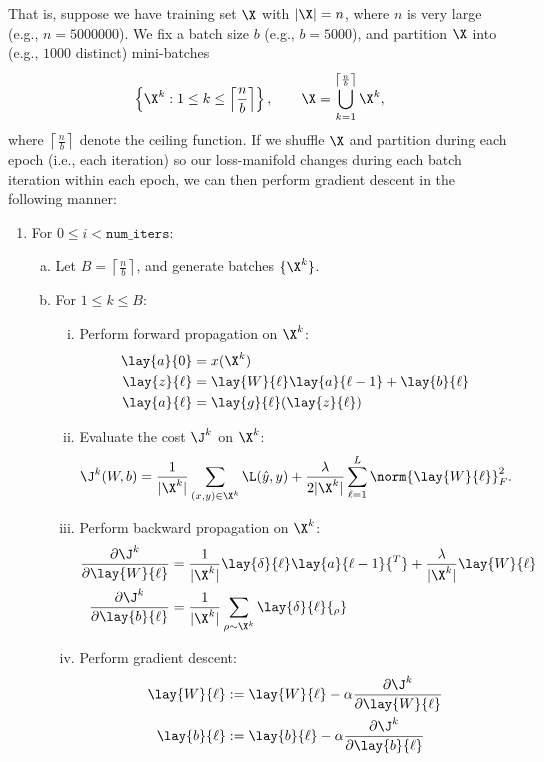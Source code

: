That is, suppose we have training set $\X$ with $|\X|=n$, where $n$ is very large (e.g., $n=5000000$).  We fix a batch size $b$ (e.g., $b=5000$), and partition $\X$ into (e.g., $1000$ distinct) mini-batches
$$\left\{\X^k:1\leq k\leq \left\lceil\frac{n}{b}\right\rceil\right\},\qquad\X=\bigcup_{k=1}^{\left\lceil\frac{n}{b}\right\rceil}\X^k,$$
where $\left\lceil\frac{n}{b}\right\rceil$ denote the ceiling function.  If we shuffle $\X$ and partition during each epoch (i.e., each iteration) so our loss-manifold changes during each batch iteration within each epoch, we can then perform gradient descent in the following manner:
\begin{enumerate}[1.]
	\item For $0\leq i<\texttt{num\_iters}$:
		\begin{enumerate}[a.]
			\item Let $B=\left\lceil\frac{n}{b}\right\rceil$, and generate batches $\{\X^k\}$.
			\item For $1\leq k\leq B$:
			\begin{enumerate}[i.]
				\item Perform forward propagation on $\X^k$:
				\begin{align*}
					\lay{a}{0}&=x(\X^k)\\
					\lay{z}{\ell}&=\lay{W}{\ell}\lay{a}{\ell-1}+\lay{b}{\ell}\\
					\lay{a}{\ell}&=\lay{g}{\ell}(\lay{z}{\ell})
				\end{align*}
				\item Evaluate the cost $\J^k$ on $\X^k$:
				$$\J^k(W,b)=\frac{1}{|\X^k|}\sum_{(x,y)\in\X^k}\L(\hat{y},y)+\frac{\lambda}{2|\X^k|}\sum_{\ell=1}^L\norm{\lay{W}{\ell}}_F^2.$$
				\item Perform backward propagation on $\X^k$:
				\begin{align*}
					\frac{\partial\J^k}{\partial\lay{W}{\ell}}&=\frac{1}{|\X^k|}\lay{\delta}{\ell}\lay{a}{\ell - 1}{^T}+\frac{\lambda}{|\X^k|}\lay{W}{\ell}\\
					\frac{\partial\J^k}{\partial\lay{b}{\ell}}&=\frac{1}{|\X^k|}\sum_{\rho\sim\X^k}\lay{\delta}{\ell}{_\rho}
				\end{align*}
				\item Perform gradient descent:
				\begin{align*}
					\lay{W}{\ell}&:=\lay{W}{\ell}-\alpha \frac{\partial\J^k}{\partial\lay{W}{\ell}}\\
					\lay{b}{\ell}&:=\lay{b}{\ell}-\alpha \frac{\partial\J^k}{\partial\lay{b}{\ell}}
				\end{align*}
			\end{enumerate}
		\end{enumerate}
\end{enumerate}

